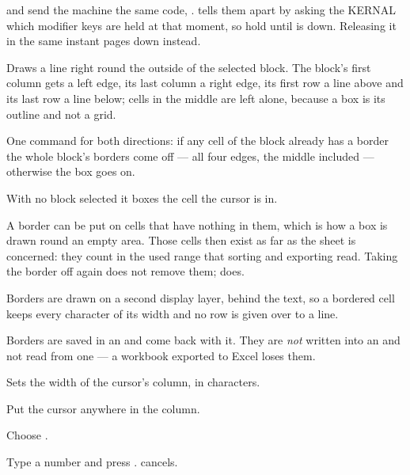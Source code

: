 \begin{cccaution}
 and  send the machine the same code, .
\ccprod{} tells them apart by asking the KERNAL which modifier keys are held
at that moment, so hold  until  is down. Releasing it in the
same instant pages down instead.
\end{cccaution}


Draws a line right round the outside of the selected block. The block's
first column gets a left edge, its last column a right edge, its first row a
line above and its last row a line below; cells in the middle are left
alone, because a box is its outline and not a grid.

One command for both directions: if any cell of the block already has a
border the whole block's borders come off --- all four edges, the middle
included --- otherwise the box goes on.

With no block selected it boxes the cell the cursor is in.

A border can be put on cells that have nothing in them, which is how a box
is drawn round an empty area. Those cells then exist as far as the sheet is
concerned: they count in the used range that sorting and exporting read.
Taking the border off again does not remove them; 
does.

\begin{ccnote}
Borders are drawn on a second display layer, behind the text, so a bordered
cell keeps every character of its width and no row is given over to a line.
\end{ccnote}

\begin{cccaution}
Borders are saved in an  and come back with it. They are
\emph{not} written into an  and not read from one --- a
workbook exported to Excel loses them.
\end{cccaution}


Sets the width of the cursor's column, in characters.

\begin{ccprocedure}[]
\item Put the cursor anywhere in the column.
\item Choose .
\item Type a number and press .  cancels.
\end{ccprocedure}

